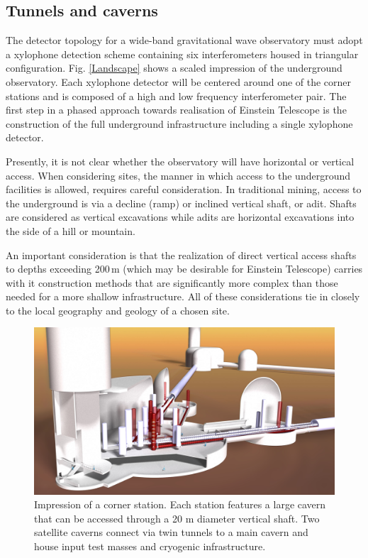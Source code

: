 \subsection{Tunnels and caverns}
\label{subsec:tunnels_caverns}
The detector topology for a wide-band gravitational wave observatory must adopt a xylophone detection scheme containing six interferometers housed in triangular configuration. Fig. \ref{Landscape} shows a scaled impression of the underground observatory. Each xylophone detector will be centered around one of the corner stations and is composed of a high and low frequency interferometer pair. The first step in a phased approach towards realisation of Einstein Telescope is the construction of the full underground infrastructure including a single xylophone detector. 

Presently, it is not clear whether the observatory will have horizontal or vertical access. When considering sites, the manner in which access to the underground facilities is allowed, requires careful consideration. In traditional mining, access to the underground is via a decline (ramp) or inclined vertical shaft, or adit. Shafts are considered as vertical excavations while adits are horizontal excavations into the side of a hill or mountain. 

An important consideration is that the realization of direct vertical access shafts to depths exceeding 200\,m (which may be desirable for Einstein Telescope) carries with it construction methods that are significantly more complex than those needed for a more shallow infrastructure. All of these considerations tie in closely to the local geography and geology of a chosen site.
\begin{figure}[htbp!]
	\centering
		\includegraphics[width=17cm]{SiteInfra/TunnelsCaverns/TunnelsCavernsFigures/ShaftAccess.jpg}
		\caption{Impression of a corner station. Each station features a large cavern that can be accessed through a 20 m diameter vertical shaft. Two satellite caverns connect via twin tunnels to a main cavern and house input test masses and cryogenic infrastructure.}
	\label{shaftaccess}
\end{figure}

